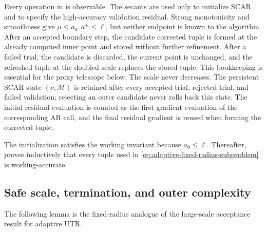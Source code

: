 \documentclass{article}
\begin{document}
Every operation in  is observable.
The secants are used only to initialize SCAR and to specify the
high-accuracy validation residual.  Strong monotonicity and smoothness
give $\mu\le a_0,a^+\le\ell$, but neither endpoint is known to the
algorithm.  After an accepted boundary step, the candidate corrected
tuple is formed at the already computed inner point and stored without
further refinement.  After a failed trial, the candidate is discarded,
the current point is unchanged, and the refreshed tuple at
the doubled scale replaces the stored tuple.  This bookkeeping is
essential for the proxy telescope below.  The scale never decreases.
The persistent SCAR state $(\nu,\mathcal M)$ is retained after every
accepted trial, rejected trial, and failed validation; rejecting an
outer candidate never rolls back this state.  The initial residual
evaluation is counted as the first gradient evaluation of the
corresponding AR call, and the final residual gradient is reused when
forming the corrected tuple.

The initialization satisfies the working invariant because
$a_0\le\ell$.  Thereafter,  proves
inductively that every tuple used in
\eqref{eq:adaptive-fixed-radius-subproblem} is working-accurate.

\subsection{Safe scale, termination, and outer complexity}

The following lemma is the fixed-radius analogue of the large-scale
acceptance result for adaptive UTR.
\end{document}
